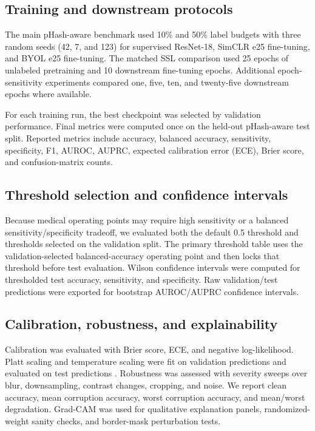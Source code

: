 \documentclass[pdflatex,sn-mathphys-num]{sn-jnl}
\theoremstyle{thmstyleone}
\theoremstyle{thmstyletwo}
\theoremstyle{thmstylethree}
\begin{document}
\subsection{Training and downstream protocols}\label{subsec:training}

The main pHash-aware benchmark used 10\% and 50\% label budgets with three random seeds (42, 7, and 123) for supervised ResNet-18, SimCLR e25 fine-tuning, and BYOL e25 fine-tuning. The matched SSL comparison used 25 epochs of unlabeled pretraining and 10 downstream fine-tuning epochs. Additional epoch-sensitivity experiments compared one, five, ten, and twenty-five downstream epochs where available.

For each training run, the best checkpoint was selected by validation performance. Final metrics were computed once on the held-out pHash-aware test split. Reported metrics include accuracy, balanced accuracy, sensitivity, specificity, F1, AUROC, AUPRC, expected calibration error (ECE), Brier score, and confusion-matrix counts.

\subsection{Threshold selection and confidence intervals}\label{subsec:thresholds}

Because medical operating points may require high sensitivity or a balanced sensitivity/specificity tradeoff, we evaluated both the default 0.5 threshold and thresholds selected on the validation split. The primary threshold table uses the validation-selected balanced-accuracy operating point and then locks that threshold before test evaluation. Wilson confidence intervals were computed for thresholded test accuracy, sensitivity, and specificity. Raw validation/test predictions were exported for bootstrap AUROC/AUPRC confidence intervals.

\subsection{Calibration, robustness, and explainability}\label{subsec:reliability}

Calibration was evaluated with Brier score, ECE, and negative log-likelihood. Platt scaling and temperature scaling were fit on validation predictions and evaluated on test predictions \cite{guo2017calibration}. Robustness was assessed with severity sweeps over blur, downsampling, contrast changes, cropping, and noise. We report clean accuracy, mean corruption accuracy, worst corruption accuracy, and mean/worst degradation. Grad-CAM \cite{selvaraju2017gradcam} was used for qualitative explanation panels, randomized-weight sanity checks, and border-mask perturbation tests.
\end{document}
